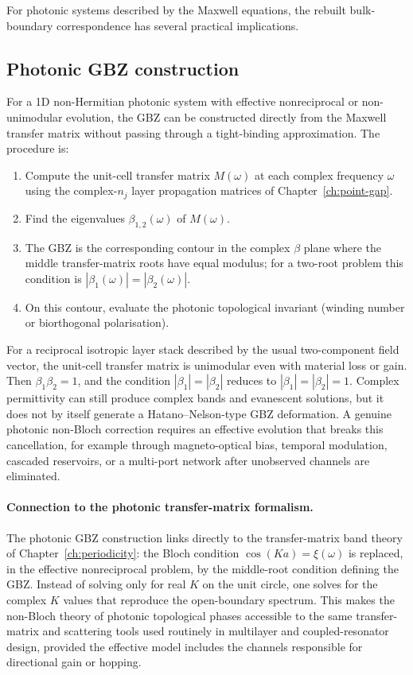 For photonic systems described by the Maxwell equations, the rebuilt
bulk-boundary correspondence has several practical implications.

\subsection{Photonic GBZ construction}
\label{ssec:photonic-gbz}

For a 1D non-Hermitian photonic system with effective nonreciprocal or
non-unimodular evolution, the GBZ can be constructed directly from the
Maxwell transfer matrix without passing through a tight-binding
approximation. The procedure is:
\begin{enumerate}
 \item Compute the unit-cell transfer matrix $M(\omega)$ at each
 complex frequency $\omega$ using the complex-$n_j$ layer
 propagation matrices of Chapter~\ref{ch:point-gap}.
 \item Find the eigenvalues $\beta_{1,2}(\omega)$ of $M(\omega)$.
 \item The GBZ is the corresponding contour in the complex $\beta$
 plane where the middle transfer-matrix roots have equal modulus; for a
 two-root problem this condition is $|\beta_1(\omega)|=|\beta_2(\omega)|$.
 \item On this contour, evaluate the photonic topological invariant
 (winding number or biorthogonal polarisation).
\end{enumerate}
For a reciprocal isotropic layer stack described by the usual
two-component field vector, the unit-cell transfer matrix is unimodular
even with material loss or gain. Then $\beta_1\beta_2=1$, and the
condition $|\beta_1|=|\beta_2|$ reduces to $|\beta_1|=|\beta_2|=1$.
Complex permittivity can still produce complex bands and evanescent
solutions, but it does not by itself generate a Hatano--Nelson-type GBZ
deformation. A genuine photonic non-Bloch correction requires an
effective evolution that breaks this cancellation, for example through
magneto-optical bias, temporal modulation, cascaded reservoirs, or a
multi-port network after unobserved channels are eliminated.

\paragraph{Connection to the photonic transfer-matrix formalism.}
The photonic GBZ construction links directly to the transfer-matrix
band theory of Chapter~\ref{ch:periodicity}: the Bloch condition
$\cos(Ka)=\xi(\omega)$ is replaced, in the effective nonreciprocal
problem, by the middle-root condition defining the GBZ. Instead of
solving only for real $K$ on the unit circle, one solves for the complex
$K$ values that reproduce the open-boundary spectrum. This makes the
non-Bloch theory of photonic topological phases accessible to the same
transfer-matrix and scattering tools used routinely in multilayer and
coupled-resonator design, provided the effective model includes the
channels responsible for directional gain or hopping.

